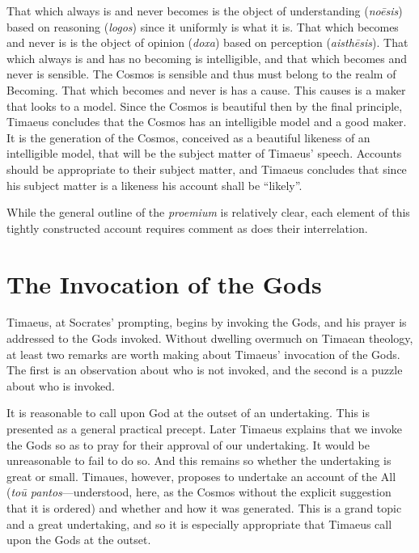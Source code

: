 That which always is and never becomes is the object of understanding (\emph{noēsis}) based on reasoning (\emph{logos}) since it uniformly is what it is. That which becomes and never is is the object of opinion (\emph{doxa}) based on perception (\emph{aisthēsis}). That which always is and has no becoming is intelligible, and that which becomes and never is sensible. The Cosmos is sensible and thus must belong to the realm of Becoming. That which becomes and never is has a cause. This causes is a maker that looks to a model. Since the Cosmos is beautiful then by the final principle, Timaeus concludes that the Cosmos has an intelligible model and a good maker. It is the generation of the Cosmos, conceived as a beautiful likeness of an intelligible model, that will be the subject matter of Timaeus' speech. Accounts should be appropriate to their subject matter, and Timaeus concludes that since his subject matter is a likeness his account shall be ``likely''.

While the general outline of the \emph{proemium} is relatively clear, each element of this tightly constructed account requires comment as does their interrelation. 


\section{The Invocation of the Gods} %
\label{sec:the_invocation_of_the_gods}

Timaeus, at Socrates' prompting, begins by invoking the Gods, and his prayer is addressed to the Gods invoked. Without dwelling overmuch on Timaean theology, at least two remarks are worth making about Timae\-us' invocation of the Gods. The first is an observation about who is not invoked, and the second is a puzzle about who is invoked.

It is reasonable to call upon God at the outset of an undertaking. This is presented as a general practical precept. Later Timaeus explains that we invoke the Gods so as to pray for their approval of our undertaking. It would be unreasonable to fail to do so. And this remains so whether the undertaking is great or small. Timaues, however, proposes to undertake an account of the All (\emph{toū pantos}---understood, here, as the Cosmos without the explicit suggestion that it is ordered) and whether and how it was generated. This is a grand topic and a great undertaking, and so it is especially appropriate that Timaeus call upon the Gods at the outset.

